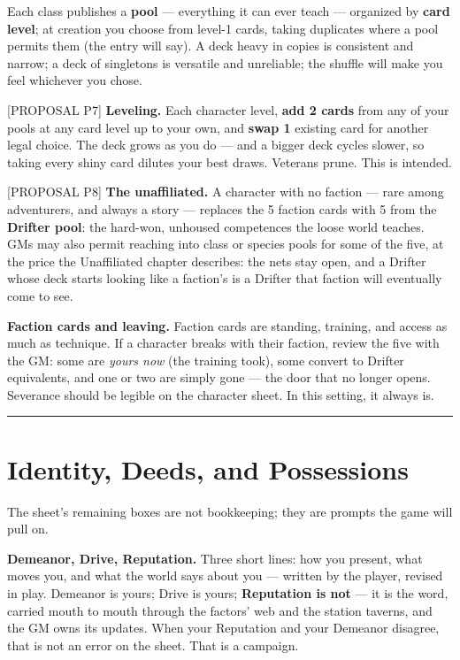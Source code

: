Each class publishes a \textbf{pool} --- everything it can ever teach --- organized by \textbf{card level}; at creation you choose from level-1 cards, taking duplicates where a pool permits them (the entry will say). A deck heavy in copies is consistent and narrow; a deck of singletons is versatile and unreliable; the shuffle will make you feel whichever you chose.

[PROPOSAL P7] \textbf{Leveling.} Each character level, \textbf{add 2 cards} from any of your pools at any card level up to your own, and \textbf{swap 1} existing card for another legal choice. The deck grows as you do --- and a bigger deck cycles slower, so taking every shiny card dilutes your best draws. Veterans prune. This is intended.

[PROPOSAL P8] \textbf{The unaffiliated.} A character with no faction --- rare among adventurers, and always a story --- replaces the 5 faction cards with 5 from the \textbf{Drifter pool}: the hard-won, unhoused competences the loose world teaches. GMs may also permit reaching into class or species pools for some of the five, at the price the Unaffiliated chapter describes: the nets stay open, and a Drifter whose deck starts looking like a faction's is a Drifter that faction will eventually come to see.

\textbf{Faction cards and leaving.} Faction cards are standing, training, and access as much as technique. If a character breaks with their faction, review the five with the GM: some are \textit{yours now} (the training took), some convert to Drifter equivalents, and one or two are simply gone --- the door that no longer opens. Severance should be legible on the character sheet. In this setting, it always is.

\medskip\hrule\medskip

\section{Identity, Deeds, and Possessions}

The sheet's remaining boxes are not bookkeeping; they are prompts the game will pull on.

\textbf{Demeanor, Drive, Reputation.} Three short lines: how you present, what moves you, and what the world says about you --- written by the player, revised in play. Demeanor is yours; Drive is yours; \textbf{Reputation is not} --- it is the word, carried mouth to mouth through the factors' web and the station taverns, and the GM owns its updates. When your Reputation and your Demeanor disagree, that is not an error on the sheet. That is a campaign.

